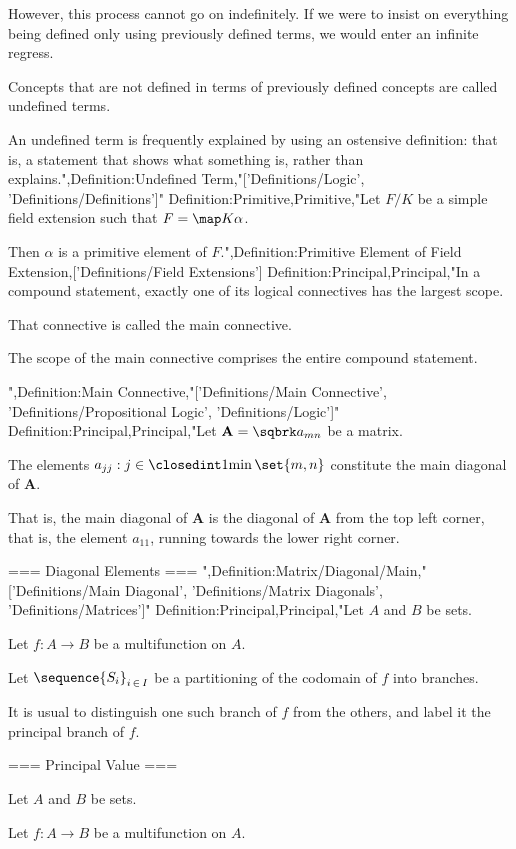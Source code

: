However, this process cannot go on indefinitely. If we were to insist on everything being defined only using previously defined terms, we would enter an infinite regress.


Concepts that are not defined in terms of previously defined concepts are called undefined terms.

An undefined term is frequently explained by using an ostensive definition: that is, a statement that shows what something is, rather than explains.",Definition:Undefined Term,"['Definitions/Logic', 'Definitions/Definitions']"
Definition:Primitive,Primitive,"Let $F / K$ be a simple field extension such that $F = \map K \alpha$.


Then $\alpha$ is a primitive element of $F$.",Definition:Primitive Element of Field Extension,['Definitions/Field Extensions']
Definition:Principal,Principal,"In a compound statement, exactly one of its logical connectives has the largest scope.

That connective is called the main connective.

The scope of the main connective comprises the entire compound statement.


",Definition:Main Connective,"['Definitions/Main Connective', 'Definitions/Propositional Logic', 'Definitions/Logic']"
Definition:Principal,Principal,"Let $\mathbf A = \sqbrk a_{m n}$ be a matrix.

The elements $a_{j j}: j \in \closedint 1 {\min \set {m, n} }$ constitute the main diagonal of $\mathbf A$.

That is, the main diagonal of $\mathbf A$ is the diagonal of $\mathbf A$ from the top left corner, that is, the element $a_{1 1}$, running towards the lower right corner.


=== Diagonal Elements ===
",Definition:Matrix/Diagonal/Main,"['Definitions/Main Diagonal', 'Definitions/Matrix Diagonals', 'Definitions/Matrices']"
Definition:Principal,Principal,"Let $A$ and $B$ be sets.

Let $f: A \to B$ be a multifunction on $A$.

Let $\sequence {S_i}_{i \mathop \in I}$ be a partitioning of the codomain of $f$ into branches.


It is usual to distinguish one such branch of $f$ from the others, and label it the principal branch of $f$.


=== Principal Value ===

Let $A$ and $B$ be sets.

Let $f: A \to B$ be a multifunction on $A$.

